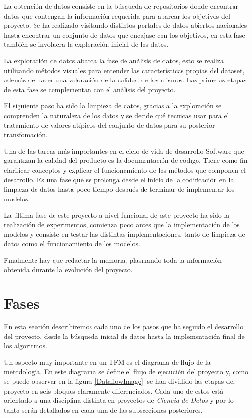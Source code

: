 La obtención de datos consiste en la búsqueda de repositorios donde encontrar datos que contengan la información requerida para abarcar los objetivos del proyecto. Se ha realizado visitando distintos portales de datos abiertos nacionales hasta encontrar un conjunto de datos que encajase con los objetivos, en esta fase también se involucra la exploración inicial de los datos.

La exploración de datos abarca la fase de análisis de datos, esto se realiza utilizando métodos visuales para entender las características propias del dataset, además de hacer una valoración de la calidad de los mismos. Las primeras etapas de esta fase se complementan con el análisis del proyecto.

El siguiente paso ha sido la limpieza de datos, gracias a la exploración se comprenden la naturaleza de los datos y se decide qué tecnicas usar para el tratamiento de valores atípicos del conjunto de datos para su posterior transfomación.

Una de las tareas más importantes en el ciclo de vida de desarrollo Software que garantizan la calidad del producto es la documentación de código. Tiene como fin
clarificar conceptos y explicar el funcionamiento de los métodos que componen el desarrollo. Es una fase que se prolonga desde el inicio de la codificación en la limpieza de datos hasta poco tiempo después de terminar de implementar los modelos.

La última fase de este proyecto a nivel funcional de este proyecto ha sido la realización de experimentos, comienza poco antes que la implementación de los modelos y consiste en testar las distintas implementaciones, tanto de limpieza de datos como el funcionamiento de los modelos.

Finalmente hay que redactar la memoria, plasmando toda la información obtenida durante la evolución del proyecto.



\section{Fases}

    En esta sección describiremos cada uno de los pasos que ha seguido el desarrollo del proyecto, desde la búsqueda inicial de datos hasta la implementación final de los algoritmos.

    Un aspecto muy importante en un TFM es el diagrama de flujo de la metodología. En este diagrama se define el flujo de ejecución del proyecto y, como se puede observar en la figura \eqref{DataflowImage}, se han dividido las etapas del proyecto en seis bloques claramente diferenciados. Cada uno de estos está orientado a una disciplina distinta en proyectos de \textit{Ciencia de Datos} y por lo tanto serán detallados en cada una de las subsecciones posteriores.


